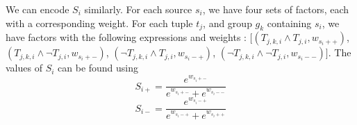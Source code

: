 \documentclass{sig-alternate}
\newcommand{\logit}{\mathrm{logit}}
\begin{document}
We can encode $S_i$ similarly. For each source $s_i$, we have four sets of factors, each with a corresponding weight. For each tuple $t_j$, and group $g_k$ containing $s_i$, we have factors with the following expressions and weights : $[(T_{j,k,i} \land T_{j,i}, w_{s_i++})$, $(T_{j,k,i} \land \lnot T_{j,i}, w_{s_i+-})$, $(\lnot T_{j,k,i} \land T_{j,i}, w_{s_i-+})$, $(\lnot T_{j,k,i} \land \lnot T_{j,i}, w_{s_i--})]$. The values of $S_i$ can be found using 
$$S_{i+} = \frac{e^{w_{s_i+-}}}{e^{w_{s_i+-}} + e^{w_{s_i--}}}$$
$$S_{i-} = \frac{e^{w_{s_i-+}}}{e^{w_{s_i-+}} + e^{w_{s_i++}}}$$

\begin{comment}
To encode $T$, for each $T_j$, we have a factor consisting of node $T_j$, boolean expression $T_j$, and weight $w_T = \logit([1,0]T)$. To encode $G_k$, for each $T_{j,k}$, we have four factors containing $T_{j,k}, T_{j}$. Their expressions and weights are given by:
\noindent
($T_{j,k} \land T_j$; $w_{g_k++} = [1,0]G_k[1,0]^T$)\\ 
($T_{j,k} \land \lnot T_j$; $w_{g_k+-} = [1,0]G_k[0,1]^T$)\\
($\lnot T_{j,k} \land T_j$; $w_{g_k-+} = [0,1]G_k[1,0]^T$)\\ 
($\lnot T_{j,k} \land \lnot T_j$; $w_{g_k--} = [0,1]G_k[0,1]^T$)

The weights are shared over all tuples, and only depend on the group. That is the factor with expression $T_{1,k} \land T_{1}$ must have the same weight $w_{g_1++}$ as the factor with $T_{2,k} \land t_2$, and so on. We also impose an additional constraint for each $k$, namely: $$e^{w_{g_k++}} + e^{w_{g_k-+}} = e^{w_{g_k+-}} + e^{w_{g_k--}}$$. Such constraints on weights can be taken into account in the weight learning process. Once the weights are learned, the false positive and negative rates can be recovered using the equations $$G_{k-} = \frac{e^{w_{g_k-+}}}{e^{w_{g_k-+}} + e^{w_{g_k++}}}$$ 
$$G_{k+} = \frac{e^{w_{g_k+-}}}{e^{w_{g_k+-}} + e^{w_{g_k--}}}$$

We can similarly encode source error rates $S_i$. For each tuple $T_j$, and each group $g_k$ containing $s_i$, we create four factors containing $T_{j,k,i}, T_{j,k}$. The expressions and weights of the factors are:

\noindent
($T_{j,k,i} \land T_{j,k}$; $w_{s_i++} = [1,0]S_i[1,0]^T$)\\ 
($T_{j,k,i} \land \lnot T_{j,k}$; $w_{s_i+-} = [1,0]S_i[0,1]^T$)\\
($\lnot T_{j,k,i} \land T_{j,k}$; $w_{s_i-+} = [0,1]S_i[1,0]^T$)\\ 
($\lnot T_{j,k,i} \land \lnot T_{j,k}$; $w_{s_i--} = [0,1]S_i[0,1]^T$)

We again have the constraint $$e^{w_{s_i++}} + e^{w_{s_i-+}} = e^{w_{s_i+-}} + e^{w_{s_i--}}$$ for each $i$. And the false positive and negative rates can be found using 
$$S_{i-} = \frac{e^{w_{s_i-+}}}{e^{w_{s_i-+}} + e^{w_{s_i++}}}$$ 
$$S_{i+} = \frac{e^{w_{s_i+-}}}{e^{w_{s_i+-}} + e^{w_{s_i--}}}$$
\end{comment}
\end{document}
